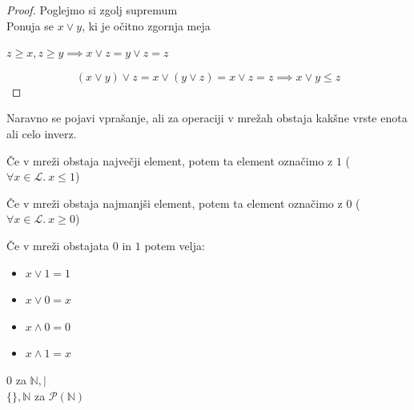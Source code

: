 \documentclass{beamer}
\begin{document}
\begin{frame}
\begin{proof}
\centering
Poglejmo si zgolj supremum\\ \pause
Ponuja se $x \lor y$, ki je očitno zgornja meja
\begin{center}
$z \geq x, z \geq y \implies x \lor z = y \lor z = z$ \pause
\end{center} 
$$(x \lor y) \lor z = x \lor (y \lor z) = x \lor z = z \implies x \lor y \leq z$$
\end{proof}


\end{frame}

\begin{frame}

\begin{block}{}
Naravno se pojavi vprašanje, ali za operaciji v mrežah obstaja kakšne vrste enota ali celo inverz.
\end{block}

\begin{definition}
Če v mreži obstaja največji element, potem ta element označimo z $1$ ($\forall x \in \mathcal{L}. \ x \leq 1$)
\end{definition}

\begin{definition}
Če v mreži obstaja najmanjši element, potem ta element označimo z $0$ ($\forall x \in \mathcal{L}. \ x \geq 0$)
\end{definition}

\end{frame}

\begin{frame}
\begin{block}{}
Če v mreži obstajata $0$ in $1$ potem velja:
\begin{itemize}
\item $x \lor 1 = 1$
\item $x \lor 0 = x$
\item $x \land 0 = 0$
\item $x \land 1 = x$
\end{itemize}
\end{block}

\pause
\begin{example}
$0$ za $\mathbb{N}, |$\\ $\{ \}, \mathbb{N}$ za $\mathcal{P}(\mathbb{N})$
\end{example}

\end{frame}
\end{document}
